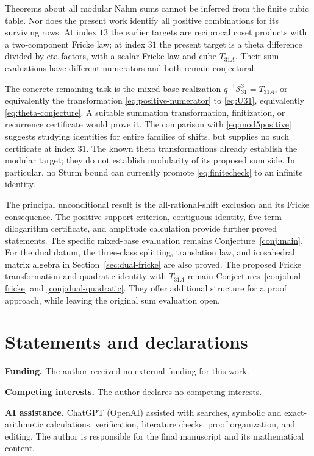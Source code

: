 \documentclass[11pt,reqno]{amsart}
\newcommand{\Ssum}{\mathcal S_{31}}
\theoremstyle{remark}
\numberwithin{equation}{section}
\begin{document}
Theorems about all modular Nahm sums cannot be inferred from the finite
cubic table. Nor does the present work identify all positive combinations
for its surviving rows. At index $13$ the earlier targets are reciprocal
coset products with a two-component Fricke law; at index $31$ the
present target is a theta difference divided by eta factors, with a
scalar Fricke law and cube $T_{31A}$. Their sum evaluations have
different numerators and both remain conjectural.

The concrete remaining task is the mixed-base realization
$q^{-1}\Ssum^3=T_{31A}$, or equivalently the transformation
\eqref{eq:positive-numerator} to \eqref{eq:U31}, equivalently
\eqref{eq:theta-conjecture}. A suitable summation transformation,
finitization, or recurrence certificate would prove it. The comparison
with \eqref{eq:mod5positive} suggests studying identities for entire
families of shifts, but supplies no such certificate at index $31$.
The known theta transformations already establish the modular target;
they do not establish modularity of its proposed sum side.
In particular, no Sturm bound can currently promote
\eqref{eq:finitecheck} to an infinite identity.

The principal unconditional result is the all-rational-shift exclusion
and its Fricke consequence. The positive-support criterion, contiguous
identity, five-term dilogarithm certificate, and amplitude calculation
provide further proved statements.
The specific mixed-base evaluation remains Conjecture~\ref{conj:main}.
For the dual datum, the three-class splitting, translation law, and
icosahedral matrix algebra in Section~\ref{sec:dual-fricke} are also
proved. The proposed Fricke transformation and quadratic identity
with $T_{31A}$ remain Conjectures~\ref{conj:dual-fricke} and
\ref{conj:dual-quadratic}. They offer additional structure for a proof
approach, while leaving the original sum evaluation open.

\section*{Statements and declarations}
\noindent\textbf{Funding.} The author received no external funding for this work.

\smallskip
\noindent\textbf{Competing interests.} The author declares no competing interests.

\smallskip
\noindent\textbf{AI assistance.} ChatGPT (OpenAI) assisted with searches,
symbolic and exact-arithmetic calculations, verification, literature
checks, proof organization, and editing. The author is responsible for
the final manuscript and its mathematical content.
\end{document}
